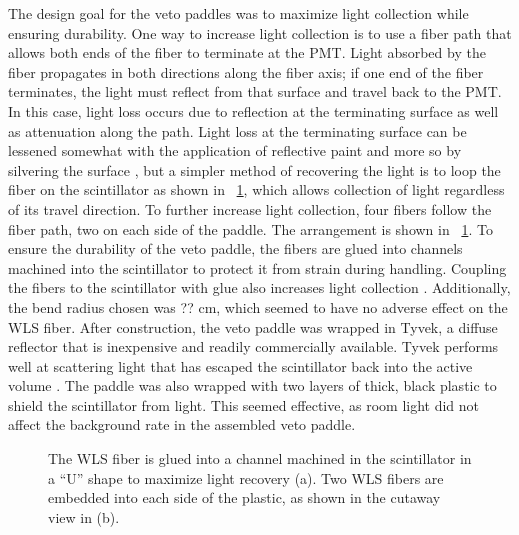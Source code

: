 The design goal for the veto paddles was to maximize light collection while ensuring durability.  One way to increase light collection is to use a fiber path that allows both ends of the fiber to terminate at the PMT.  Light absorbed by the fiber propagates in both directions along the fiber axis; if one end of the fiber terminates, the light must reflect from that surface and travel back to the PMT.  In this case, light loss occurs due to reflection at the terminating surface as well as attenuation along the path.  Light loss at the terminating surface can be lessened somewhat with the application of reflective paint and more so by silvering the surface \cite{WLS_mirrorFinish}, but a simpler method of recovering the light is to loop the fiber on the scintillator as shown in {\fig}~\ref{fig:paddle}, which allows collection of light regardless of its travel direction.  To further increase light collection, four fibers follow the fiber path, two on each side of the paddle.  The arrangement is shown in {\fig}~\ref{fig:paddle}.  To ensure the durability of the veto paddle, the fibers are glued into channels machined into the scintillator to protect it from strain during handling.  Coupling the fibers to the scintillator with glue also increases light collection \cite{Aguillion_scintTiles}.  Additionally, the bend radius chosen was ?? cm, which seemed to have no adverse effect on the WLS fiber.  After construction, the veto paddle was wrapped in Tyvek, a diffuse reflector that is inexpensive and readily commercially available.  Tyvek performs well at scattering light that has escaped the scintillator back into the active volume \cite{YongWeiTyvek}.  The paddle was also wrapped with two layers of thick, black plastic to shield the scintillator from light.  This seemed effective, as room light did not affect the background rate in the assembled veto paddle.  
\begin{figure}[!htbp]
\centering
{}
\caption{The WLS fiber is glued into a channel machined in the scintillator in a ``U'' shape to maximize light recovery (a).  Two WLS fibers are embedded into each side of the plastic, as shown in the cutaway view in (b).}
\label{fig:paddle}
\end{figure}

